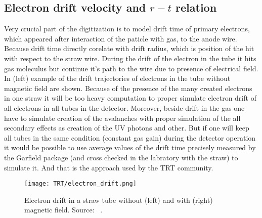 \subsection{Electron drift velocity and $r-t$ relation}

Very crucial part of the digitization is to model drift time of primary electrons, which appeared after interaction of the paticle with gas, to the anode wire.
Because drift time directly corelate with drift radius, which is position of the hit with respect to the straw wire.
During the drift of the electron in the tube it hits gas moleculus but continue it's path to the wire due to presence of electrical field.
In  (left) example of the drift trajectories of electrons in the tube without magnetic field are shown.
Because of the presence of the many created electrons in one straw it will be too heavy computation to proper simulate electron drift of all electrons in all
tubes in the detector. Moreover, beside drift in the gas one have to simulate creation of the avalanches with proper simulation of the all secondary effects
as creation of the UV photons and other. But if one will keep all tubes in the same condition (constant gas gain) during the detector operation it would
be possible to use average values of the drift time precisely measured by the Garfield package (and cross checked in the labratory with the straw) to simulate it.
And that is the approach used by the TRT community. 

\begin{figure}
\begin{center}
 \texttt{[image: TRT/electron\_drift.png]}
\caption {Electron drift in a straw tube without (left) and with (right) magnetic field. Source: ~\cite{cwetanski_thesis}. 
}
\end{center}
\label{fig:clusterDriftInTube}
\end{figure}

